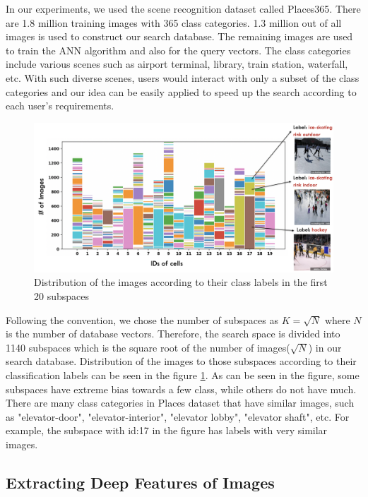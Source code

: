 In our experiments, we used the scene recognition dataset called Places365\cite{zhou2017places}. 
There are 1.8 million training images with 365 class categories. 
1.3 million out of all images is used to construct our search database. The remaining images are used to train the ANN algorithm and also for the query vectors.
The class categories include various scenes such as airport terminal, library, train station, waterfall, etc. 
With such diverse scenes, users would interact with only a subset of the class categories and our idea can be easily applied to speed up the search according to each user's requirements.

\begin{figure}
    \centering
    \includegraphics[width=\textwidth]{thesis/images/label_dist-fig.png}
    \caption{Distribution of the images according to their class labels in the first 20 subspaces}
    \label{fig:label-dist}
\end{figure}

Following the convention, we chose the number of subspaces as $K=\sqrt{N}$ where $N$ is the number of database vectors. 
Therefore, the search space is divided into 1140 subspaces which is the square root of the number of images($\sqrt{N}$) in our search database. 
Distribution of the images to those subspaces according to their classification labels can be seen in the figure \ref{fig:label-dist}.
As can be seen in the figure, some subspaces have extreme bias towards a few class, while others do not have much. 
There are many class categories in Places dataset that have similar images, such as "elevator-door", "elevator-interior", "elevator lobby", "elevator shaft", etc.
For example, the subspace with id:17 in the figure has labels with very similar images.


\subsection{Extracting Deep Features of Images}
\label{extractdeepfeatures}

